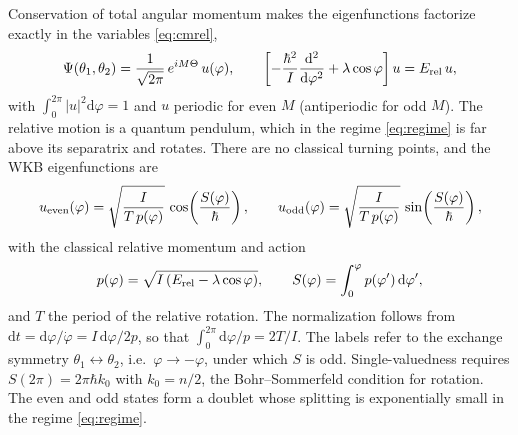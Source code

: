 \documentclass[aps,preprint,12pt,superscriptaddress,nofootinbib]{revtex4-2}
\newcommand{\dd}{\mathrm{d}}
\newcommand{\Erel}{E_{\rm rel}}
\begin{document}
Conservation of total angular momentum makes the eigenfunctions factorize exactly in
the variables \eqref{eq:cmrel},
\begin{equation}
\Psi(\theta_{1},\theta_{2})=\frac{1}{\sqrt{2\pi}}\,e^{iM\Theta}\,u(\varphi),
\qquad
\left[-\frac{\hbar^{2}}{I}\frac{\dd^{2}}{\dd\varphi^{2}}+\lambda\cos\varphi\right]
u=\Erel\,u,
\label{eq:factor}
\end{equation}
with $\int_{0}^{2\pi}|u|^{2}\dd\varphi=1$ and $u$ periodic for even $M$ (antiperiodic
for odd $M$). The relative motion is a quantum pendulum, which in the regime
\eqref{eq:regime} is far above its separatrix and rotates. There are no classical
turning points, and the WKB eigenfunctions are
\begin{equation}
u_{\rm even}(\varphi)=\sqrt{\frac{I}{T\,p(\varphi)}}\,
\cos\!\left(\frac{S(\varphi)}{\hbar}\right),\qquad
u_{\rm odd}(\varphi)=\sqrt{\frac{I}{T\,p(\varphi)}}\,
\sin\!\left(\frac{S(\varphi)}{\hbar}\right),
\label{eq:WKB}
\end{equation}
with the classical relative momentum and action
\begin{equation}
p(\varphi)=\sqrt{I\left(\Erel-\lambda\cos\varphi\right)},\qquad
S(\varphi)=\int_{0}^{\varphi}p(\varphi')\,\dd\varphi' ,
\label{eq:action}
\end{equation}
and $T$ the period of the relative rotation. The normalization follows from
$\dd t=\dd\varphi/\dot\varphi=I\,\dd\varphi/2p$, so that
$\int_{0}^{2\pi}\dd\varphi/p=2T/I$. The labels refer to the exchange symmetry
$\theta_{1}\leftrightarrow\theta_{2}$, i.e.\ $\varphi\to-\varphi$, under which $S$ is
odd. Single-valuedness requires $S(2\pi)=2\pi\hbar k_{0}$ with $k_{0}=n/2$, the
Bohr--Sommerfeld condition for rotation. The even and odd states form a doublet
whose splitting is exponentially small in the regime \eqref{eq:regime}.
\end{document}
